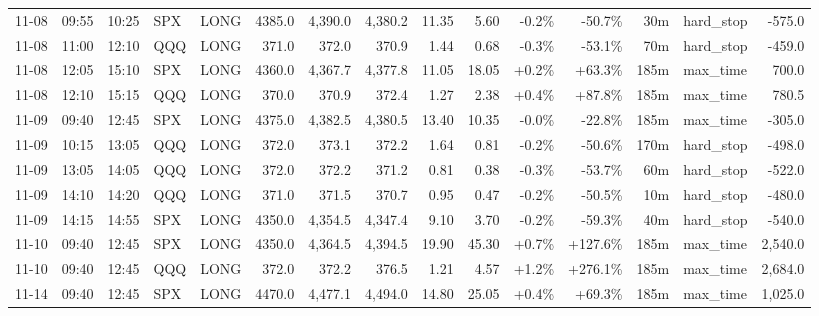 \documentclass[11pt,a4paper,twoside]{article}
\begin{document}
\begin{landscape}
\begin{center}
\begin{longtable}{>{\color{txtmain}}l l l l l r r r r r r r r >{\color{txtmain}}l r}
11-08 & 09:55 & 10:25 & SPX & LONG & 4385.0 & 4,390.0 & 4,380.2 & 11.35 & 5.60 & \textcolor{lossred}{-0.2\%} & \textcolor{lossred}{-50.7\%} & 30m & hard\_stop & \textcolor{lossred}{-575.0} \\
11-08 & 11:00 & 12:10 & QQQ & LONG & 371.0 & 372.0 & 370.9 & 1.44 & 0.68 & \textcolor{lossred}{-0.3\%} & \textcolor{lossred}{-53.1\%} & 70m & hard\_stop & \textcolor{lossred}{-459.0} \\
11-08 & 12:05 & 15:10 & SPX & LONG & 4360.0 & 4,367.7 & 4,377.8 & 11.05 & 18.05 & \textcolor{wingreen}{+0.2\%} & \textcolor{wingreen}{+63.3\%} & 185m & max\_time & \textcolor{wingreen}{700.0} \\
11-08 & 12:10 & 15:15 & QQQ & LONG & 370.0 & 370.9 & 372.4 & 1.27 & 2.38 & \textcolor{wingreen}{+0.4\%} & \textcolor{wingreen}{+87.8\%} & 185m & max\_time & \textcolor{wingreen}{780.5} \\
11-09 & 09:40 & 12:45 & SPX & LONG & 4375.0 & 4,382.5 & 4,380.5 & 13.40 & 10.35 & \textcolor{lossred}{-0.0\%} & \textcolor{lossred}{-22.8\%} & 185m & max\_time & \textcolor{lossred}{-305.0} \\
11-09 & 10:15 & 13:05 & QQQ & LONG & 372.0 & 373.1 & 372.2 & 1.64 & 0.81 & \textcolor{lossred}{-0.2\%} & \textcolor{lossred}{-50.6\%} & 170m & hard\_stop & \textcolor{lossred}{-498.0} \\
11-09 & 13:05 & 14:05 & QQQ & LONG & 372.0 & 372.2 & 371.2 & 0.81 & 0.38 & \textcolor{lossred}{-0.3\%} & \textcolor{lossred}{-53.7\%} & 60m & hard\_stop & \textcolor{lossred}{-522.0} \\
11-09 & 14:10 & 14:20 & QQQ & LONG & 371.0 & 371.5 & 370.7 & 0.95 & 0.47 & \textcolor{lossred}{-0.2\%} & \textcolor{lossred}{-50.5\%} & 10m & hard\_stop & \textcolor{lossred}{-480.0} \\
11-09 & 14:15 & 14:55 & SPX & LONG & 4350.0 & 4,354.5 & 4,347.4 & 9.10 & 3.70 & \textcolor{lossred}{-0.2\%} & \textcolor{lossred}{-59.3\%} & 40m & hard\_stop & \textcolor{lossred}{-540.0} \\
11-10 & 09:40 & 12:45 & SPX & LONG & 4350.0 & 4,364.5 & 4,394.5 & 19.90 & 45.30 & \textcolor{wingreen}{+0.7\%} & \textcolor{wingreen}{+127.6\%} & 185m & max\_time & \textcolor{wingreen}{2,540.0} \\
11-10 & 09:40 & 12:45 & QQQ & LONG & 372.0 & 372.2 & 376.5 & 1.21 & 4.57 & \textcolor{wingreen}{+1.2\%} & \textcolor{wingreen}{+276.1\%} & 185m & max\_time & \textcolor{wingreen}{2,684.0} \\
11-14 & 09:40 & 12:45 & SPX & LONG & 4470.0 & 4,477.1 & 4,494.0 & 14.80 & 25.05 & \textcolor{wingreen}{+0.4\%} & \textcolor{wingreen}{+69.3\%} & 185m & max\_time & \textcolor{wingreen}{1,025.0} \\

\end{longtable}
\end{center}
\end{landscape}
\end{document}
